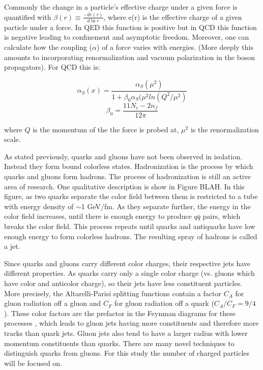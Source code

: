 Commonly the change in a particle's effective charge under a given force is quantified with  $\beta(r) \equiv \frac{-de(r)}{d\ln r}$, where e(r) is the effective charge of a given particle under a force. In QED this function is positive but in QCD this function is negative leading to confinement and asymptotic freedom. Moreover, one can calculate how the coupling ($\alpha$) of a force varies with energies. (More deeply this amounts to incorporating renormalization and vacuum polarization in the boson propagators). For QCD this is:

\begin{equation}
\alpha_{S}(x) = \frac{\alpha_{S}(\mu^{2})}{1+\beta_{0}\alpha_{S}(\mu^{2}ln(Q^{2}/\mu^{2})}
\end{equation}
\begin{equation}
\beta_{0} = \frac{11N_{c}-2n_{f}}{12\pi}
\end{equation}

where $Q$ is the momentum of the the force is probed at, $\mu^{2}$ is the renormalization scale.

As stated previously, quarks and gluons have not been observed in isolation. Instead they form bound colorless states. Hadronization is the process by which quarks and gluons form hadrons. The process of hadronization is still an active area of research. One qualitative description is show in Figure BLAH. In this figure, as two quarks separate the color field between them is restricted to a tube with energy density of $\sim$1 GeV/fm. As they separate further, the energy in the color field increases, until there is enough energy to produce $q\bar{q}$ pairs, which breaks the color field. This process repeats until quarks and antiquarks have low enough energy to form colorless hadrons. The resulting spray of hadrons is called a jet.

Since quarks and gluons carry different color charges, their respective jets have different properties. As quarks carry only a single color charge (vs. gluons which have color and anticolor charge), so their jets have less constituent particles. More precisely, the Altarelli-Parisi splitting functions \cite{altarelli} contain a factor $C_{A}$ for gluon radiation off a gluon and $C_{F}$ for gluon radiation off a quark ($C_{A}/C_{F} = 9/4$). These color factors are the prefactor in the Feynman diagrams for these processes \cite{colorfactor}, which leads to gluon jets having more constituents and therefore more tracks than quark jets. Gluon jets also tend to have a larger radius with lower momentum constituents than quarks. There are many novel techniques to distinguish quarks from gluons. For this study the number of charged particles will be focused on.  

